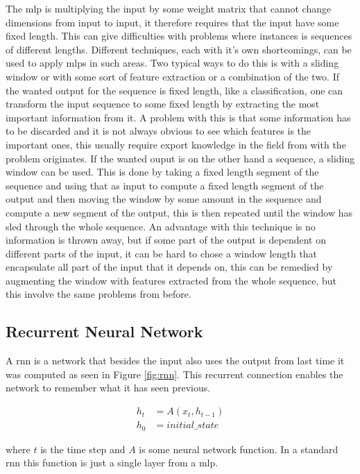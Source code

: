 The \gls{mlp} is multiplying the input by some weight matrix that cannot change dimensions from input to 
input, it therefore requires that the input have some fixed length. This can give difficulties with 
problems where instances is sequences of different lengths. Different techniques, each with it's own 
shortcomings, can be used to apply \glspl{mlp} in such areas. 
Two typical ways to do this is with a sliding window or with some sort of feature extraction or 
a combination of the two. If the wanted output for the sequence is fixed length, like a classification, 
one can transform the input sequence to some fixed length by extracting the most important information
from it. A problem with this is that some information has to be discarded and it is not always 
obvious to see which features is the important ones, this usually require export knowledge in the
field from with the problem originates. 
If the wanted ouput is on the other hand a sequence, a sliding window can be used. 
This is done by taking a fixed length segment of the sequence and using that as input to compute 
a fixed length segment of the output and then moving the window by some amount in the sequence and compute 
a new segment of the output, this is then repeated until the window has sled through the whole sequence.
An advantage with this technique is no information is thrown away, but if some part of the output is 
dependent on different parts of the input, it can be hard to chose a window length that 
encapsulate all part of the input that it depends on, this can be remedied by augmenting 
the window with features extracted from the whole sequence, but this involve the same problems 
from before.
	
\subsection{Recurrent Neural Network}

A \gls{rnn} is a network that besides the input also uses the output from last time it was computed 
as seen in Figure \ref{fig:rnn}.
This recurrent connection enables the network to remember what it has seen previous.

\begin{align*}
	h_t &= A(x_t, h_{t-1}) \\
	h_0 &= initial\_state
\end{align*}

where $t$ is the time step and $A$ is some neural network function. In a standard \gls{rnn} this 
function is just a single layer from a \gls{mlp}.

